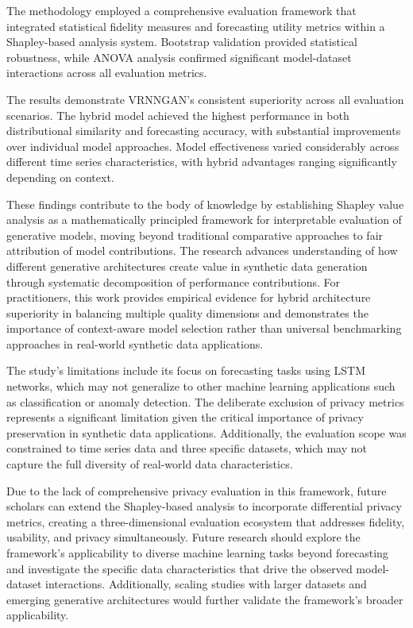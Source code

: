 \documentclass{article}
\begin{document}
The methodology employed a comprehensive evaluation framework that integrated statistical fidelity measures and forecasting utility metrics within a Shapley-based analysis system. Bootstrap validation provided statistical robustness, while ANOVA analysis confirmed significant model-dataset interactions across all evaluation metrics.

The results demonstrate VRNNGAN's consistent superiority across all evaluation scenarios. The hybrid model achieved the highest performance in both distributional similarity and forecasting accuracy, with substantial improvements over individual model approaches. Model effectiveness varied considerably across different time series characteristics, with hybrid advantages ranging significantly depending on context. 

These findings contribute to the body of knowledge by establishing Shapley value analysis as a mathematically principled framework for interpretable evaluation of generative models, moving beyond traditional comparative approaches to fair attribution of model contributions. The research advances understanding of how different generative architectures create value in synthetic data generation through systematic decomposition of performance contributions. For practitioners, this work provides empirical evidence for hybrid architecture superiority in balancing multiple quality dimensions and demonstrates the importance of context-aware model selection rather than universal benchmarking approaches in real-world synthetic data applications.

The study's limitations include its focus on forecasting tasks using LSTM networks, which may not generalize to other machine learning applications such as classification or anomaly detection. The deliberate exclusion of privacy metrics represents a significant limitation given the critical importance of privacy preservation in synthetic data applications. Additionally, the evaluation scope was constrained to time series data and three specific datasets, which may not capture the full diversity of real-world data characteristics.

Due to the lack of comprehensive privacy evaluation in this framework, future scholars can extend the Shapley-based analysis to incorporate differential privacy metrics, creating a three-dimensional evaluation ecosystem that addresses fidelity, usability, and privacy simultaneously. Future research should explore the framework's applicability to diverse machine learning tasks beyond forecasting and investigate the specific data characteristics that drive the observed model-dataset interactions. Additionally, scaling studies with larger datasets and emerging generative architectures would further validate the framework's broader applicability.
\end{document}

